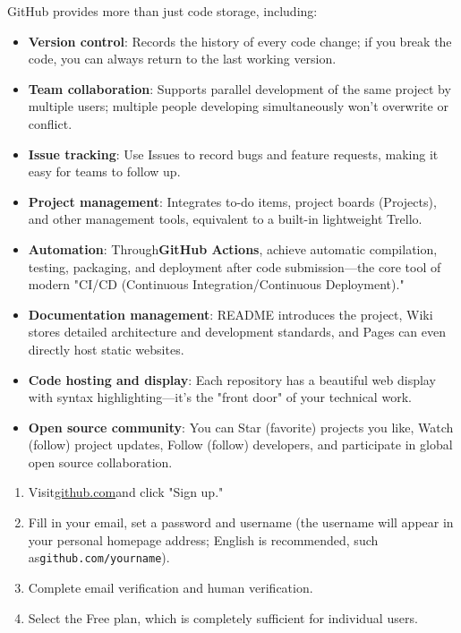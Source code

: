 
GitHub provides more than just code storage, including:

\begin{itemize}
  \item \textbf{Version control}: Records the history of every code change; if you break the code, you can always return to the last working version.
  \item \textbf{Team collaboration}: Supports parallel development of the same project by multiple users; multiple people developing simultaneously won't overwrite or conflict.
  \item \textbf{Issue tracking}: Use Issues to record bugs and feature requests, making it easy for teams to follow up.
  \item \textbf{Project management}: Integrates to-do items, project boards (Projects), and other management tools, equivalent to a built-in lightweight Trello.
  \item \textbf{Automation}: Through\textbf{GitHub Actions}, achieve automatic compilation, testing, packaging, and deployment after code submission—the core tool of modern "CI/CD (Continuous Integration/Continuous Deployment)."
  \item \textbf{Documentation management}: README introduces the project, Wiki stores detailed architecture and development standards, and Pages can even directly host static websites.
  \item \textbf{Code hosting and display}: Each repository has a beautiful web display with syntax highlighting—it's the "front door" of your technical work.
  \item \textbf{Open source community}: You can Star (favorite) projects you like, Watch (follow) project updates, Follow (follow) developers, and participate in global open source collaboration.
\end{itemize}



\begin{enumerate}
  \item Visit\href{https://github.com}{github.com}and click "Sign up."
  \item Fill in your email, set a password and username (the username will appear in your personal homepage address; English is recommended, such as\texttt{github.\allowbreak com/\allowbreak yourname}).
  \item Complete email verification and human verification.
  \item Select the Free plan, which is completely sufficient for individual users.
\end{enumerate}

